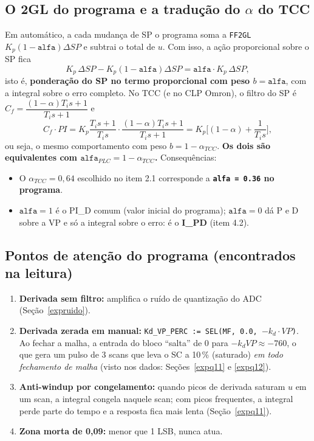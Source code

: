 \subsection{O 2GL do programa e a tradução do $\alpha$ do TCC}\label{alfaplc}
Em automático, a cada mudança de SP o programa soma a \texttt{FF2GL} $K_p(1-\mathtt{alfa})\Delta SP$ e subtrai o total de $u$. Com isso, a ação proporcional sobre o SP fica
\[
K_p\,\Delta SP-K_p(1-\mathtt{alfa})\Delta SP=\mathtt{alfa}\cdot K_p\,\Delta SP,
\]
isto é, \textbf{ponderação do SP no termo proporcional com peso $b=\mathtt{alfa}$}, com a integral sobre o erro completo. No TCC (e no CLP Omron), o filtro do SP é $C_f=\dfrac{(1-\alpha)T_is+1}{T_is+1}$ e
\[
C_f\cdot PI=K_p\frac{T_is+1}{T_is}\cdot\frac{(1-\alpha)T_is+1}{T_is+1}=K_p\Big[(1-\alpha)+\frac{1}{T_is}\Big],
\]
ou seja, o mesmo comportamento com peso $b=1-\alpha_{TCC}$. \textbf{Os dois são equivalentes com $\mathtt{alfa}_{PLC}=1-\alpha_{TCC}$.} Consequências:
\begin{itemize}
\item O $\alpha_{TCC}=0{,}64$ escolhido no item 2.1 corresponde a \textbf{\texttt{alfa = 0.36} no programa}.
\item $\mathtt{alfa}=1$ é o PI\_D comum (valor inicial do programa); $\mathtt{alfa}=0$ dá P e D sobre a VP e só a integral sobre o erro: é o \textbf{I\_PD} (item 4.2).
\end{itemize}
\subsection{Pontos de atenção do programa (encontrados na leitura)}
\begin{enumerate}
\item \textbf{Derivada sem filtro:} amplifica o ruído de quantização do ADC (Seção~\ref{expruido}).
\item \textbf{Derivada zerada em manual:} \texttt{Kd\_VP\_PERC := SEL(MF, 0.0, $-k_d\cdot VP$)}. Ao fechar a malha, a entrada do bloco ``salta'' de 0 para $-k_dVP\approx-760$, o que gera um pulso de 3 scans que leva o SC a 10\,\% (saturado) \emph{em todo fechamento de malha} (visto nos dados: Seções~\ref{expq11} e \ref{expq12}).
\item \textbf{Anti-windup por congelamento:} quando picos de derivada saturam $u$ em um scan, a integral congela naquele scan; com picos frequentes, a integral perde parte do tempo e a resposta fica mais lenta (Seção~\ref{expq11}).
\item \textbf{Zona morta de 0,09:} menor que 1 LSB, nunca atua.
\end{enumerate}

